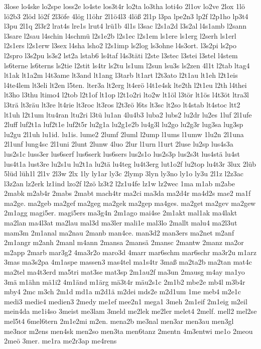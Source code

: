 {3lose
lo4ske
lo2spe
loss2e
lo4ste
los3t4r
lo2ta
lo3tha
loti4o
2l1ov
lo2ve
2lox
1lö
lö2b3
2löd
lö2f
2l3öfe
4lög
l1öhr
2l1ö4l3
4löß
2l1p
l3pa
lpe2n3
lp2f
l2p1ho
lp3t4
l3pu
2l1q
2l3r2
lrat4s
lre1s
lrut4
lrü1b
4l1s
l3sac
l2s1a2d
l3s2al
l4s1amb
l2sann
l3sare
l2sau
l4schin
l4schmü
l2s1e2b
l2s1ec
l2s1em
ls1ere
ls1erg
l2serh
ls1erl
l2s1ers
l2s1erw
l3sex
l4sha
lsho2
l2s1imp
ls2log
ls3ohne
l4s3ort.
l3s2pi
ls2po
l2spro
l3s2pu
ls3s2
lst2a
lstab6
ls4taf
l4s3täti
l2ste
l3stec
l3stei
l3stel
l4stem
ls6terne
ls6terns
ls2tie
l2stit
ls4tr
ls2tu
ls1um
l2sun
lsu3s
ls2zen
4l1t
l2tab
ltag4
lt1ak
lt1a2m
l4t3ame
lt3and
lt1ang
l3tarb
lt1art
l2t3ato
l2t1au
lt1eh
l2t1eis
l4te4lem
lt3eli
lt2en
l5ten.
lter3a
lt2erg
lt4erö
l4t1e4sk
lte2th
l2t1eu
l2th
l4thei
lt3ho
l3thu
ltimo4
l2tob
l2t1of
lt1op
l2t1o2ri
lto2w
lt1öl
l3tör
lt1ös
l4t3öt
ltra3l
l3trä
lt3räu
lt3re
lt4rie
lt3roc
lt3ros
l2t3rö
l6ts
lt3sc
lt2so
lt4stab
lt4stoc
ltt2
lt1uh
l2t1um
ltu4ran
ltu2ri
l3tü
lu1an
4lu4b3
luba2
lubs2
lu2dr
lu2es
1luf
2l1ufe
2luff
luf2t1a
luf2t1e
luf2t5r
lu2g1a
lu2g1e2b
lu4g3l
lu2go
lu2g3r
lug3sa
lug3sp
lu2gu
2l1uh
lu1id.
lu1is.
lume2
2lumf
2luml
l2ump
l1ums
l1umw
1lu2n
2l1una
2l1unf
lung4sc
2l1uni
2lunt
2lunw
4luo
2lur
l1urn
l1urt
2luse
lu2sp
lus4s3a
lus2s1c
luss3er
lus6serf
lus6serk
lus6sers
lus2s1o
lus2s3p
lus2s3t
lus4stä
lu4st
lus4t1a
lust3re
lu2s1u
lu2t1a
lu2tä
lu4teg
lu4t3erg
lut1o2f
lu2top
lu4t3r
3lux
2lüb
5lüd
lüh1l
2l1v
2l3w
2lx
1ly
ly1ar
ly3c
2lymp
3lyn
ly3no
ly1o
ly3u
2l1z
l2z3ac
l3z2an
lz2erk
lz1ind
lzo2f
l2zö
lz3t2
l2z1u4fe
lz1w
lz2wec
1ma
m1ab
m2abe
2mabk
m2ab4r
2mabs
2mabt
mach4tr
ma2ci
ma3da
ma2d4r
ma4d2s
mae2
ma1f
ma2ge.
ma2geb
ma2gef
ma2geg
ma2gek
ma2gep
ma4ges.
ma2get
ma2gev
ma2gew
2m1agg
magi5er.
magi5ers
ma3g4n
2m1ago
mai4se
2m1akt
mal1ak
ma4lakt
ma2lan
ma4l3at
ma2lau
mal3d
ma3ler
mali1e
mal3lo
2mallt
malu4
ma2l3ut
mam3m
2m1anal
ma2nau
2manb
man4ce.
man3d2
man3ers
ma2net
m2anf
2m1angr
m2anh
2manl
m4ann
2mansa
2mansä
2mansc
2mantw
2manz
ma2or
m2app
2marb
mar3g2
4ma3r2o
maro3d
4marr
mar6schm
mar6schr
ma3r2u
m1arz
3mas
ma3s2pa
4m1aspe
massen3
mas4tel
ma1s4tr
3maß
ma2ta2b
ma2tan
mat4c
ma2tel
ma4t3erd
ma5tri
mat3se
mat3sp
2m1au2f
ma3un
2mausg
m4ay
ma1yo
3mä
m1ähn
mä1i2
4m1änd
m1ärg
mä3t4r
mäu2s1c
2m1b2
mbe2e
mb4l
m3b4r
mby4
2mc
m3ch
2m1d
md1a
m2d1ä
m2dei
mds2e
m2d1um
1me
meb4
m2e1c
medi3
medie4
medien3
2medy
me1ef
mee2n1
mega1
3meh
2m1eif
2m1eig
m2eil
mein4da
me1i4so
3meist
me3lam
3meld
me2lek
me2ler
melet4
2melf.
mell2
mel2se
mel5t4
6mel6tern
2m1e2mi
m2en.
mena2b
me3nal
men3ar
men3au
men3gl
me3nor
m2ens
men4sk
men2so
men3ta
men6tanz
2mentn
4m3entwi
me1o
2meou
2meö
3mer.
me1ra
me2r3ap
me4rens
}
